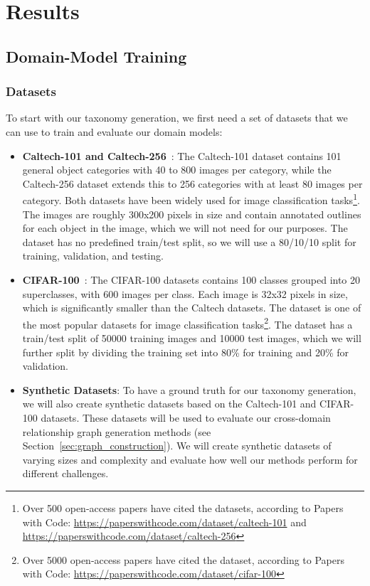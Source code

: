 \chapter{Results}

\section{Domain-Model Training}

\subsection{Datasets}

To start with our taxonomy generation,
we first need a set of datasets that we can use to train and evaluate our domain models:

\begin{itemize}
      \item \textbf{Caltech-101 and Caltech-256}~\cite{li_caltech_2022,griffin_caltech_2022}:
            The Caltech-101 dataset contains 101 general object categories with 40 to 800 images per category,
            while the Caltech-256 dataset extends this to 256 categories with at least 80 images per category.
            Both datasets have been widely used for image classification tasks\footnote{Over 500 open-access papers have cited the datasets, according to Papers with Code: \url{https://paperswithcode.com/dataset/caltech-101} and \url{https://paperswithcode.com/dataset/caltech-256}}.
            The images are roughly 300x200 pixels in size and contain annotated outlines
            for each object in the image, which we will not need for our purposes.
            The dataset has no predefined train/test split,
            so we will use a 80/10/10 split for training, validation, and testing.
      \item \textbf{CIFAR-100}~\cite{krizhevsky_learning_2009}:
            The CIFAR-100 datasets contains 100 classes grouped into 20 superclasses,
            with 600 images per class.
            Each image is 32x32 pixels in size, which is significantly smaller than the Caltech datasets.
            The dataset is one of the most popular datasets for image classification tasks\footnote{Over 5000 open-access papers have cited the dataset, according to Papers with Code: \url{https://paperswithcode.com/dataset/cifar-100}}.
            The dataset has a train/test split of 50000 training images and 10000 test images,
            which we will further split by dividing the training set into 80\% for training and 20\% for validation.
      \item \textbf{Synthetic Datasets}:
            To have a ground truth for our taxonomy generation,
            we will also create synthetic datasets based on the Caltech-101 and CIFAR-100 datasets.
            These datasets will be used to evaluate our cross-domain relationship graph generation
            methods (see Section~\ref{sec:graph_construction}).
            We will create synthetic datasets of varying sizes and complexity and evaluate
            how well our methods perform for different challenges.
\end{itemize}

